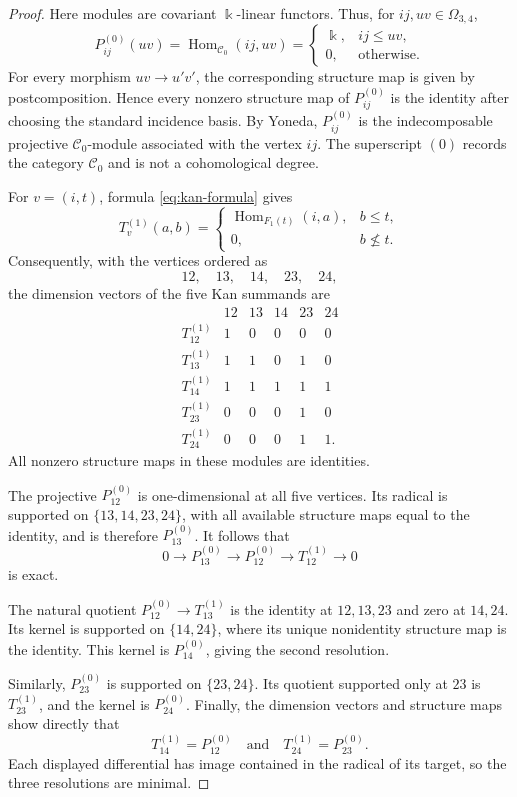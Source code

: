 \documentclass[12pt,a4paper,english,reqno]{amsart}
\theoremstyle{plain}
\theoremstyle{definition}
\newcommand{\kk}{\Bbbk}
\newcommand{\Hom}{\operatorname{Hom}}
\newcommand{\C}{\mathcal C}
\begin{document}
\begin{proof}
Here modules are covariant $\kk$-linear functors.  Thus, for
$ij,uv\in\Omega_{3,4}$,
\[
P_{ij}^{(0)}(uv)
=
\Hom_{\C_0}(ij,uv)
=
\begin{cases}
\kk,&ij\leq uv,\\
0,&\text{otherwise}.
\end{cases}
\]
For every morphism $uv\to u'v'$, the corresponding structure map is
given by postcomposition.  Hence every nonzero structure map of
$P_{ij}^{(0)}$ is the identity after choosing the standard incidence
basis.  By Yoneda, $P_{ij}^{(0)}$ is the indecomposable projective
$\C_0$-module associated with the vertex $ij$.  The superscript $(0)$
records the category $\C_0$ and is not a cohomological degree.

For $v=(i,t)$, formula \eqref{eq:kan-formula} gives
\[
 T_v^{(1)}(a,b)
 =
 \begin{cases}
  \Hom_{F_1(t)}(i,a),&b\leq t,\\
  0,&b\nleq t.
 \end{cases}
\]
Consequently, with the vertices ordered as
\[
 12,\quad13,\quad14,\quad23,\quad24,
\]
the dimension vectors of the five Kan summands are
\[
\begin{array}{c|ccccc}
 &12&13&14&23&24\\ \hline
 T_{12}^{(1)}&1&0&0&0&0\\
 T_{13}^{(1)}&1&1&0&1&0\\
 T_{14}^{(1)}&1&1&1&1&1\\
 T_{23}^{(1)}&0&0&0&1&0\\
 T_{24}^{(1)}&0&0&0&1&1.
\end{array}
\]
All nonzero structure maps in these modules are identities.

The projective $P_{12}^{(0)}$ is one-dimensional at all five vertices.
Its radical is supported on
$\{13,14,23,24\}$, with all available structure maps equal to the
identity, and is therefore $P_{13}^{(0)}$.  It follows that
\[
 0\longrightarrow P_{13}^{(0)}
 \longrightarrow P_{12}^{(0)}
 \longrightarrow T_{12}^{(1)}
 \longrightarrow0
\]
is exact.

The natural quotient $P_{12}^{(0)}\to T_{13}^{(1)}$ is the identity at
$12,13,23$ and zero at $14,24$.  Its kernel is supported on
$\{14,24\}$, where its unique nonidentity structure map is the identity.
This kernel is $P_{14}^{(0)}$, giving the second resolution.

Similarly, $P_{23}^{(0)}$ is supported on $\{23,24\}$.  Its quotient
supported only at $23$ is $T_{23}^{(1)}$, and the kernel is
$P_{24}^{(0)}$.  Finally, the dimension vectors and structure maps show
directly that
\[
 T_{14}^{(1)}=P_{12}^{(0)}
 \quad\text{and}\quad
 T_{24}^{(1)}=P_{23}^{(0)}.
\]
Each displayed differential has image contained in the radical of its
target, so the three resolutions are minimal.
\end{proof}
\end{document}
